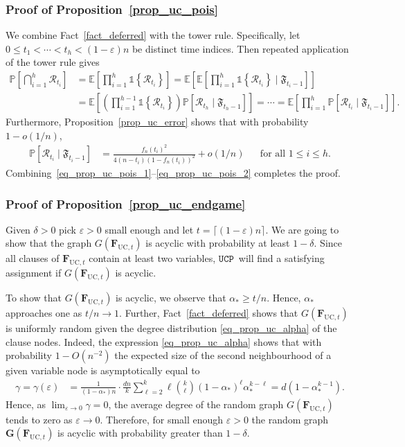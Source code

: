 \documentclass[10pt,reqno]{amsart}
\numberwithin{equation}{section}
\newcommand{\pastim}{\fF_{t_i-1}}
\newcommand{\pasthm}{\fF_{t_h-1}}
\newcommand{\everrti}{\cR_{t_i}}
\newcommand{\everrth}{\cR_{t_h}}
\renewcommand{\vec}[1]{\boldsymbol{#1}}
\newcommand{\FUC}[1]{\PHI_{\mathrm{UC},{#1}}}
\newcommand{\UCP}{\ensuremath{\mathtt{UCP}}}
\newcommand\G{\vec G}
\newcommand\PHI{\vec F}
\newcommand\cR{\mathcal R}
\newcommand\fF{\mathfrak F}
\newcommand\eps{\varepsilon}
\newcommand\Erw{\mathbb{E}}
\newcommand{\vecone}{\mathbb{1}}
\newcommand\bc[1]{\left({#1}\right)}
\newcommand\cbc[1]{\left\{{#1}\right\}}
\newcommand\brk[1]{\left\lbrack{#1}\right\rbrack}
\newcommand\pr{\mathbb{P}}
\renewcommand\Pr{\pr}
\newcommand\Prop{Proposition}
\def\pr{{\mathbb P}}
\begin{document}
\subsubsection{Proof of \Prop~\ref{prop_uc_pois}}\label{sec_prop_uc_pois}
	We combine Fact~\ref{fact_deferred} with the tower rule.
	Specifically, let $0\leq t_1<\cdots<t_h<(1-\eps)n$ be distinct time indices.
	Then repeated application of the tower rule gives
	\begin{align}\nonumber
		\Pr\brk{\bigcap_{i=1}^h \everrti}&= \Erw\brk{\prod_{i=1}^h \vecone\cbc{\everrti}} =  \Erw\brk{ \Erw\brk{\prod_{i=1}^h \vecone \cbc{\everrti} \mid \pastim } }\\
										 &= \Erw\brk{ \bc{\prod_{i=1}^{h-1} \vecone\cbc{\everrti}}  \pr\brk{\everrth \mid \pasthm } } = \cdots=\Erw\brk{\prod_{i=1}^{h} \pr\brk{\everrti \mid \pastim }  }.\label{eq_prop_uc_pois_1}
	\end{align}
	Furthermore, \Prop~\ref{prop_uc_error} shows that with probability $1-o(1/n)$,
	\begin{align}\label{eq_prop_uc_pois_2}
		\pr\brk{\everrti \mid \pastim }&= \frac{f_n(t_i)^2}{4(n-t_i)(1-f_n(t_i))^2}+o(1/n)&&\mbox{for all }1\leq i\leq h.
	\end{align}
Combining~\eqref{eq_prop_uc_pois_1}--\eqref{eq_prop_uc_pois_2} completes the proof.

	
	


\subsubsection{Proof of \Prop~\ref{prop_uc_endgame}}\label{sec_prop_uc_endgame}
Given $\delta>0$ pick $\eps>0$ small enough and let $t=\lceil(1-\eps)n\rceil$.
We are going to show that the graph $G(\FUC t)$ is acyclic with probability at least $1-\delta$.
Since all clauses of $\FUC t$ contain at least two variables, \UCP\ will find a satisfying assignment if $G(\FUC t)$ is acyclic.

To show that $G(\FUC t)$ is acyclic, we observe that $\alpha_*\geq t/n$.
Hence, $\alpha_*$ approaches one as $t/n\to1$.
Further, Fact~\ref{fact_deferred} shows that $G(\FUC t)$ is uniformly random given the degree distribution \eqref{eq_prop_uc_alpha} of the clause nodes.
Indeed, the expression \eqref{eq_prop_uc_alpha} shows that with probability $1-O(n^{-2})$ the expected size of the second neighbourhood of a given variable node is asymptotically equal to
	\begin{align*}
		\gamma=\gamma(\eps)&=\frac1{(1-\alpha_*)n}\cdot\frac{dn}{k}\sum_{\ell=2}^k\ell\binom k\ell(1-\alpha_*)^\ell\alpha_*^{k-\ell}=d(1-\alpha_*^{k-1}).
	\end{align*}
Hence, as $\lim_{\eps\to 0}\gamma=0$, the average degree of the random graph $G(\FUC t)$ tends to zero as $\eps\to0$.
Therefore, for small enough $\eps>0$ the random graph $\G(\FUC t)$ is acyclic with probability greater than $1-\delta$.
\end{document}
